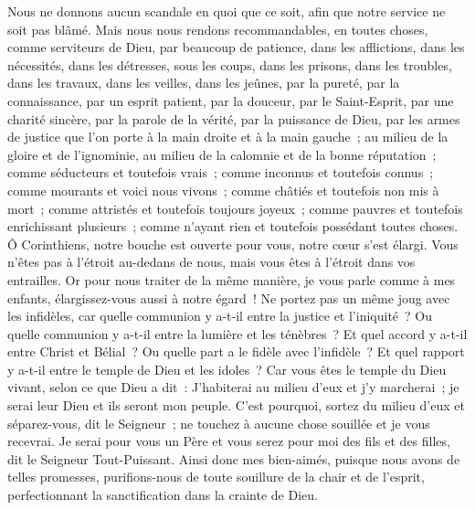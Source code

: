 \begin{multicols}{2}
Nous ne donnons aucun scandale en quoi que ce soit, afin que notre service ne soit pas blâmé.
Mais nous nous rendons recommandables, en toutes choses, comme serviteurs de Dieu, par beaucoup de patience, dans les afflictions, dans les nécessités, dans les détresses,
sous les coups, dans les prisons, dans les troubles, dans les travaux, dans les veilles, dans les jeûnes,
par la pureté, par la connaissance, par un esprit patient, par la douceur, par le Saint-Esprit, par une charité sincère,
par la parole de la vérité, par la puissance de Dieu, par les armes de justice que l'on porte à la main droite et à la main gauche~;
au milieu de la gloire et de l'ignominie, au milieu de la calomnie et de la bonne réputation~; comme séducteurs et toutefois vrais~;
comme inconnus et toutefois connus~; comme mourants et voici nous vivons~; comme châtiés et toutefois non mis à mort~;
comme attristés et toutefois toujours joyeux~; comme pauvres et toutefois enrichissant plusieurs~; comme n'ayant rien et toutefois possédant toutes choses.
Ô Corinthiens, notre bouche est ouverte pour vous, notre cœur s'est élargi.
Vous n'êtes pas à l'étroit au-dedans de nous, mais vous êtes à l'étroit dans vos entrailles.
Or pour nous traiter de la même manière, je vous parle comme à mes enfants, élargissez-vous aussi à notre égard~!
Ne portez pas un même joug avec les infidèles, car quelle communion y a-t-il entre la justice et l'iniquité~? Ou quelle communion y a-t-il entre la lumière et les ténèbres~?
Et quel accord y a-t-il entre Christ et Bélial~? Ou quelle part a le fidèle avec l'infidèle~?
Et quel rapport y a-t-il entre le temple de Dieu et les idoles~? Car vous êtes le temple du Dieu vivant, selon ce que Dieu a dit~: J'habiterai au milieu d'eux et j'y marcherai~; je serai leur Dieu et ils seront mon peuple.
C'est pourquoi, sortez du milieu d'eux et séparez-vous, dit le Seigneur~; ne touchez à aucune chose souillée et je vous recevrai.
Je serai pour vous un Père et vous serez pour moi des fils et des filles, dit le Seigneur Tout-Puissant.
\VerseOne{}Ainsi donc mes bien-aimés, puisque nous avons de telles promesses, purifions-nous de toute souillure de la chair et de l'esprit, perfectionnant la sanctification dans la crainte de Dieu.

\end{multicols}
